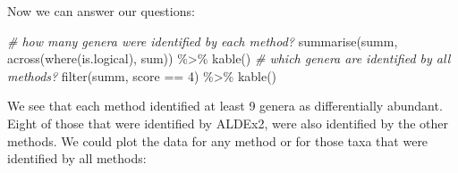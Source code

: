 \documentclass[
]{book}
\newenvironment{Shaded}{\begin{snugshade}}{\end{snugshade}}
\newcommand{\CommentTok}[1]{\textcolor[rgb]{0.56,0.35,0.01}{\textit{#1}}}
\newcommand{\DecValTok}[1]{\textcolor[rgb]{0.00,0.00,0.81}{#1}}
\newcommand{\FunctionTok}[1]{\textcolor[rgb]{0.00,0.00,0.00}{#1}}
\newcommand{\NormalTok}[1]{#1}
\newcommand{\SpecialCharTok}[1]{\textcolor[rgb]{0.00,0.00,0.00}{#1}}
\begin{document}
Now we can answer our questions:

\begin{Shaded}
\begin{Highlighting}[]
\CommentTok{\# how many genera were identified by each method?}
\FunctionTok{summarise}\NormalTok{(summ, }\FunctionTok{across}\NormalTok{(}\FunctionTok{where}\NormalTok{(is.logical), sum)) }\SpecialCharTok{\%\textgreater{}\%}
  \FunctionTok{kable}\NormalTok{()}
\CommentTok{\# which genera are identified by all methods?}
\FunctionTok{filter}\NormalTok{(summ, score }\SpecialCharTok{==} \DecValTok{4}\NormalTok{) }\SpecialCharTok{\%\textgreater{}\%} \FunctionTok{kable}\NormalTok{()}
\end{Highlighting}
\end{Shaded}

We see that each method identified at least 9 genera as differentially
abundant. Eight of those that were identified by ALDEx2,
were also identified by the other methods. We could plot the data for
any method or for those taxa that were identified by all methods:
\end{document}

